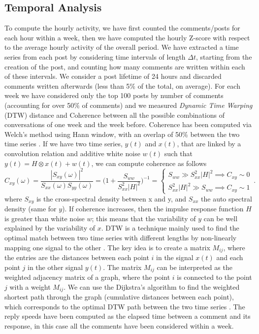 \documentclass[fleqn,10pt]{wlscirep}
\begin{document}
\subsection*{Temporal Analysis}
%
To compute the hourly activity, we have first counted the comments/posts for each hour within a week, then we have computed the hourly Z-score with respect to the average hourly activity of the overall period.
%
We have extracted a time series from each post by considering time intervals of length $\Delta t$, starting from the creation of the post, and counting how many comments are written within each of these intervals. We consider a post lifetime of 24 hours and discarded comments written afterwards (less than 5\% of the total, on average). 
For each week we have considered only the top 100 posts by number of comments (accounting for over 50\% of comments) and we measured \emph{Dynamic Time Warping} (DTW) distance \cite{bellman1959adaptive} and Coherence between all the possible combinations of conversations of one week and the week before. 
%
Coherence has been computed via Welch's method \cite{welch_coherence} using Hann window, with an overlap of 50\% between the two time series \cite{virtanen2020scipy}. If we have two time series, $y(t)$ and $x(t)$, that are linked by a convolution relation and additive white noise $w(t)$ such that $y(t) = {H\otimes x}(t) + w(t)$, we can compute coherence as follows
\begin{equation}
C_{xy}(\omega) = \frac{|S_{xy}(\omega)|^2}{S_{xx}(\omega)S_{yy}(\omega)}=\biggl(1+\frac{S_{ww}}{S_{xx}^2|H|^2}\biggr)^{-1}=\begin{cases}S_{ww} \gg S_{xx}^2|H|^2 \implies C_{xy} \sim 0 \\
S_{xx}^2|H|^2 \gg S_{ww} \implies C_{xy} \sim 1
\end{cases}\,.
\end{equation}
where $S_{xy}$ is the cross-spectral density between x and y, and $S_{xx}$ the auto spectral density (same for $y$).
If coherence increases, then the impulse response function $H$ is greater than white noise $w$; this means that the variability of $y$ can be well explained by the variability of $x$.
DTW is a technique mainly used to find the optimal match between two time series with different lengths by non-linearly mapping one signal to the other \cite{berndt1994using}.
The key idea is to create a matrix $M_{ij}$, where the entries are the distances between each point $i$ in the signal $x(t)$ and each point $j$ in the other signal $y(t)$. The matrix $M_{ij}$ can be interpreted as the weighted adjacency matrix of a graph, where the point $i$ is connected to the point $j$ with a weight $M_{ij}$. 
We can use the Dijkstra's algorithm to find the weighted shortest path through the graph (cumulative distances between each point), which corresponds to the optimal DTW path between the two time series \cite{berndt1994using}.
The reply speeds have been computed as the elapsed time between a comment and its response, in this case all the comments have been considered within a week.
%
\end{document}
